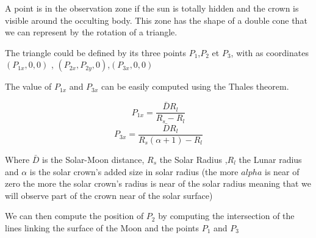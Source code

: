\documentclass[11pt]{article} %
\begin{document}
		
		A point is in the observation zone if the sun is totally hidden and the crown is visible around the occulting body. This zone has the shape of a double cone that we can represent by the rotation of a triangle.
		
		
		The triangle could be defined by its three points
		$P_1$,$P_2$ et $P_3$, with as coordinates $(P_{1x},0,0)$ , $(P_{2x},P_{2y},0)$,$(P_{3x},0,0)$ 
		
		
		The value of $P_{1x}$ and $P_{3x}$ can be easily computed using the Thales theorem.
		
		
		$$	
		P_{1x}=\frac{\bar{D}R_l}{R_s-R_l}
		$$ 
		$$	
		P_{3x}=\frac{\bar{D}R_l}{R_s(\alpha+1)-R_l}
		$$
		
		Where $\bar{D}$ is the Solar-Moon distance, $R_s$ the Solar Radius ,$R_l$ the Lunar radius and $\alpha$ is the solar crown's added size in solar radius (the more $alpha$ is near of zero the more the solar crown's radius is near of the solar radius meaning that we will observe part of the crown near of the solar surface)
		
		We can then compute the position of $P_2$ by computing the intersection of the lines linking the surface of the Moon and the points $P_1$ and $P_3$
		
		
\end{document}
